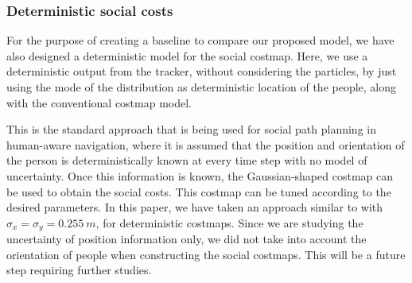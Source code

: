 \subsubsection{Deterministic social costs}
For the purpose of creating a baseline to compare our proposed model, we have also designed a deterministic model for the social costmap. 
Here, we use a deterministic output from the tracker, without considering the particles, by just using the mode of the distribution as deterministic location of the people, along with the conventional costmap model. 


This is the standard approach that is being used for social path planning in human-aware navigation, where it is assumed that the position and orientation of the person is deterministically known at every time step with no model of uncertainty. Once this information is known, the Gaussian-shaped costmap can be used to obtain the social costs. This costmap can be tuned according to the desired parameters. In this paper, we have taken an approach similar to \cite{gomez2013social} with ${\sigma}_{x} = {\sigma}_{y} = 0.255\ m$, for deterministic costmaps. Since we are studying the uncertainty of position information only, we did not take into account the orientation of people when constructing the social costmaps. This will be a future step requiring further studies.


 



